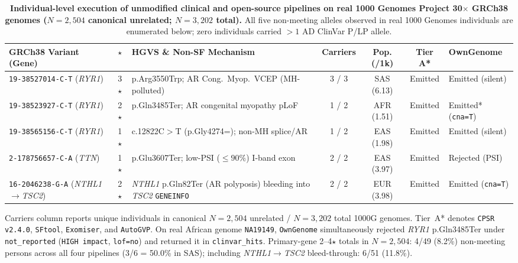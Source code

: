 \documentclass[11pt,letterpaper]{article}
\begin{document}
\begin{table}[!t]
\centering
\caption{\textbf{Individual-level execution of unmodified clinical and open-source pipelines on real 1000 Genomes Project 30$\times$ GRCh38 genomes ($N=2{,}504$ canonical unrelated; $N=3{,}202$ total).} All five non-meeting alleles observed in real 1000 Genomes individuals are enumerated below; zero individuals carried $>1$ AD ClinVar P/LP allele.}
\label{tab:g1k}
\footnotesize
\setlength{\tabcolsep}{2.2pt}
\begin{tabularx}{\textwidth}{L{2.92cm} c Y c c c C{1.78cm}}
\toprule
\textbf{GRCh38 Variant (Gene)} & \textbf{$\star$} & \textbf{HGVS \& Non-SF Mechanism} & \textbf{Carriers} & \textbf{Pop. (/1k)} & \textbf{Tier A*} & \textbf{OwnGenome} \\
\midrule
\texttt{19-38527014-C-T} (\textit{RYR1}) & 3$\star$ & p.Arg3550Trp; AR Cong.\ Myop.\ VCEP (MH-polluted) & 3 / 3 & SAS (6.13) & Emitted & Emitted (silent) \\
\texttt{19-38523927-C-T} (\textit{RYR1}) & 2$\star$ & p.Gln3485Ter; AR congenital myopathy pLoF & 1 / 2 & AFR (1.51) & Emitted & Emitted* (\texttt{cna=T}) \\
\texttt{19-38565156-C-T} (\textit{RYR1}) & 1$\star$ & c.12822C$>$T (p.Gly4274=); non-MH splice/AR & 1 / 2 & EAS (1.98) & Emitted & Emitted (silent) \\
\texttt{2-178756657-C-A} (\textit{TTN}) & 1$\star$ & p.Glu3607Ter; low-PSI ($\le 90\%$) I-band exon & 2 / 2 & EAS (3.97) & Emitted & Rejected (PSI) \\
\midrule
\texttt{16-2046238-G-A} (\textit{NTHL1}$\rightarrow$\textit{TSC2}) & 2$\star$ & \textit{NTHL1} p.Gln82Ter (AR polyposis) bleeding into \textit{TSC2} \texttt{GENEINFO} & 2 / 2 & EUR (3.98) & Emitted & Emitted (\texttt{cna=T}) \\
\bottomrule
\end{tabularx}
\vspace{2pt}

\raggedright\footnotesize{Carriers column reports unique individuals in canonical $N=2{,}504$ unrelated / $N=3{,}202$ total 1000G genomes. Tier~A* denotes \texttt{CPSR v2.4.0}, \texttt{SFtool}, \texttt{Exomiser}, and \texttt{AutoGVP}. On real African genome \texttt{NA19149}, \texttt{OwnGenome} simultaneously rejected \textit{RYR1} p.Gln3485Ter under \texttt{not\_reported} (\texttt{HIGH impact}, \texttt{lof=no}) and returned it in \texttt{clinvar\_hits}. Primary-gene 2--4$\star$ totals in $N=2{,}504$: 4/49 (8.2\%) non-meeting persons across all four pipelines (3/6 = 50.0\% in SAS); including \textit{NTHL1}$\rightarrow$\textit{TSC2} bleed-through: 6/51 (11.8\%).}
\end{table}
\end{document}
